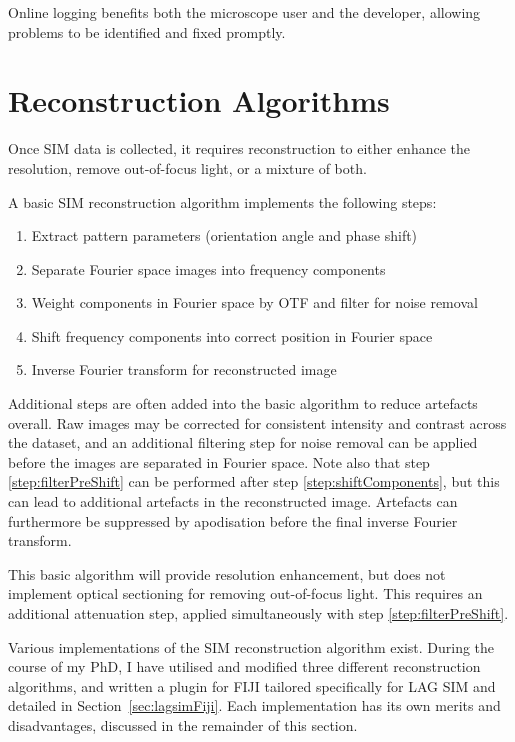 Online logging benefits both the microscope user and the developer, allowing problems to be identified and fixed promptly. 


\section{Reconstruction Algorithms} \label{sec:recon}
Once SIM data is collected, it requires reconstruction to either enhance the resolution, remove out-of-focus light, or a mixture of both.

A basic SIM reconstruction algorithm implements the following steps:
\begin{enumerate}
	\item Extract pattern parameters (orientation angle and phase shift)
	\item Separate Fourier space images into frequency components
	\item \label{step:filterPreShift}Weight components in Fourier space by OTF and filter for noise removal
	\item \label{step:shiftComponents}Shift frequency components into correct position in Fourier space
	\item Inverse Fourier transform for reconstructed image
\end{enumerate}

Additional steps are often added into the basic algorithm to reduce artefacts overall. 
Raw images may be corrected for consistent intensity and contrast across the dataset, and an additional filtering step for noise removal can be applied before the images are separated in Fourier space. 
Note also that step \ref{step:filterPreShift} can be performed after step \ref{step:shiftComponents}, but this can lead to additional artefacts in the reconstructed image. 
Artefacts can furthermore be suppressed by apodisation before the final inverse Fourier transform. 

This basic algorithm will provide resolution enhancement, but does not implement optical sectioning for removing out-of-focus light.
This requires an additional attenuation step, applied simultaneously with step \ref{step:filterPreShift}. 

Various implementations of the SIM reconstruction algorithm exist.
During the course of my PhD, I have utilised and modified three different reconstruction algorithms, and written a plugin for FIJI tailored specifically for LAG SIM and detailed in Section~\ref{sec:lagsimFiji}.
Each implementation has its own merits and disadvantages, discussed in the remainder of this section.

